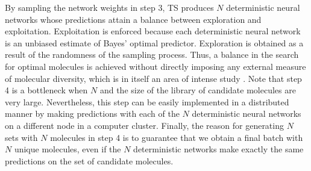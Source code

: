 By sampling the network weights in step 3, TS produces $N$ deterministic neural networks whose predictions attain a balance between exploration and exploitation. Exploitation is enforced because each deterministic neural network is an unbiased estimate of Bayes' optimal predictor. Exploration is obtained as a result of the randomness of the sampling process. 
Thus, a balance in the search for optimal molecules is achieved without directly imposing any external measure of molecular diversity, which is in itself an area of intense study \cite{Maldonado_2006}. 
Note that step 4 is a bottleneck when $N$ and the size of the library of candidate molecules are very large.
Nevertheless, this step can be easily implemented in a distributed manner by making predictions with each of
the $N$ deterministic neural networks on a different node in a computer cluster. Finally, the reason for generating $N$ sets with $N$ molecules in step 4 is to guarantee that we obtain a final batch with $N$ unique molecules, even if the $N$ deterministic networks make exactly the same predictions on the set of candidate molecules.